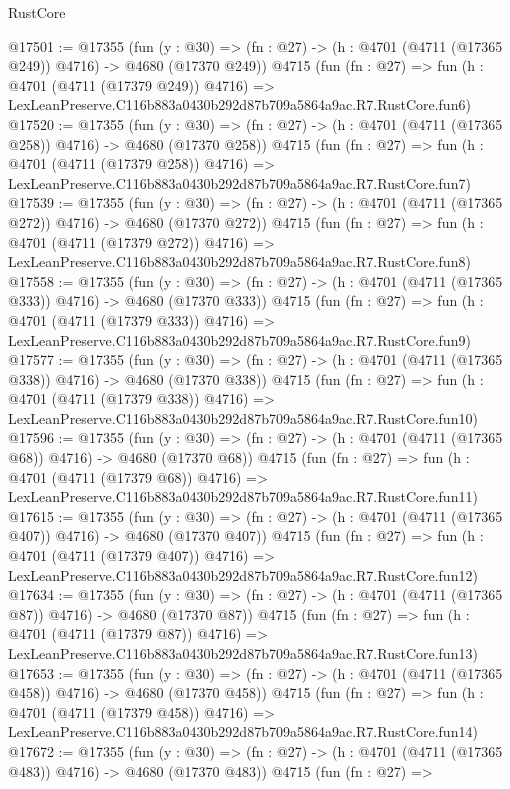 \begin{lexlean}{RustCore}
\begin{coremodule}
@17501 := @17355
    (fun (y : @30) => (fn : @27) -> (h : @4701 (@4711 (@17365 @249)) @4716) -> @4680 (@17370 @249))
    @4715
    (fun (fn : @27) =>
    fun (h : @4701 (@4711 (@17379 @249)) @4716) =>
    LexLeanPreserve.C116b883a0430b292d87b709a5864a9ac.R7.RustCore.fun6)
@17520 := @17355
    (fun (y : @30) => (fn : @27) -> (h : @4701 (@4711 (@17365 @258)) @4716) -> @4680 (@17370 @258))
    @4715
    (fun (fn : @27) =>
    fun (h : @4701 (@4711 (@17379 @258)) @4716) =>
    LexLeanPreserve.C116b883a0430b292d87b709a5864a9ac.R7.RustCore.fun7)
@17539 := @17355
    (fun (y : @30) => (fn : @27) -> (h : @4701 (@4711 (@17365 @272)) @4716) -> @4680 (@17370 @272))
    @4715
    (fun (fn : @27) =>
    fun (h : @4701 (@4711 (@17379 @272)) @4716) =>
    LexLeanPreserve.C116b883a0430b292d87b709a5864a9ac.R7.RustCore.fun8)
@17558 := @17355
    (fun (y : @30) => (fn : @27) -> (h : @4701 (@4711 (@17365 @333)) @4716) -> @4680 (@17370 @333))
    @4715
    (fun (fn : @27) =>
    fun (h : @4701 (@4711 (@17379 @333)) @4716) =>
    LexLeanPreserve.C116b883a0430b292d87b709a5864a9ac.R7.RustCore.fun9)
@17577 := @17355
    (fun (y : @30) => (fn : @27) -> (h : @4701 (@4711 (@17365 @338)) @4716) -> @4680 (@17370 @338))
    @4715
    (fun (fn : @27) =>
    fun (h : @4701 (@4711 (@17379 @338)) @4716) =>
    LexLeanPreserve.C116b883a0430b292d87b709a5864a9ac.R7.RustCore.fun10)
@17596 := @17355
    (fun (y : @30) => (fn : @27) -> (h : @4701 (@4711 (@17365 @68)) @4716) -> @4680 (@17370 @68))
    @4715
    (fun (fn : @27) =>
    fun (h : @4701 (@4711 (@17379 @68)) @4716) =>
    LexLeanPreserve.C116b883a0430b292d87b709a5864a9ac.R7.RustCore.fun11)
@17615 := @17355
    (fun (y : @30) => (fn : @27) -> (h : @4701 (@4711 (@17365 @407)) @4716) -> @4680 (@17370 @407))
    @4715
    (fun (fn : @27) =>
    fun (h : @4701 (@4711 (@17379 @407)) @4716) =>
    LexLeanPreserve.C116b883a0430b292d87b709a5864a9ac.R7.RustCore.fun12)
@17634 := @17355
    (fun (y : @30) => (fn : @27) -> (h : @4701 (@4711 (@17365 @87)) @4716) -> @4680 (@17370 @87))
    @4715
    (fun (fn : @27) =>
    fun (h : @4701 (@4711 (@17379 @87)) @4716) =>
    LexLeanPreserve.C116b883a0430b292d87b709a5864a9ac.R7.RustCore.fun13)
@17653 := @17355
    (fun (y : @30) => (fn : @27) -> (h : @4701 (@4711 (@17365 @458)) @4716) -> @4680 (@17370 @458))
    @4715
    (fun (fn : @27) =>
    fun (h : @4701 (@4711 (@17379 @458)) @4716) =>
    LexLeanPreserve.C116b883a0430b292d87b709a5864a9ac.R7.RustCore.fun14)
@17672 := @17355
    (fun (y : @30) => (fn : @27) -> (h : @4701 (@4711 (@17365 @483)) @4716) -> @4680 (@17370 @483))
    @4715
    (fun (fn : @27) =>

\end{coremodule}
\end{lexlean}
